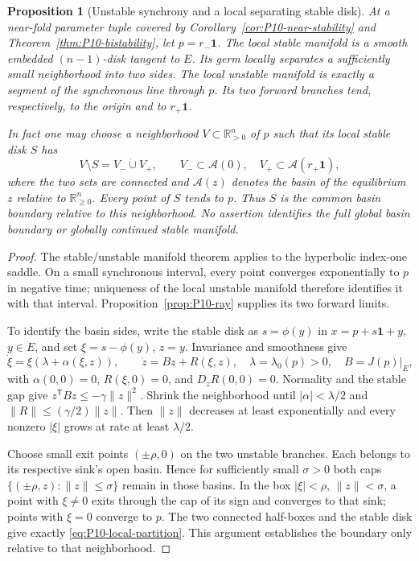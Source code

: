 \documentclass[11pt]{article}
\newcommand{\R}{\mathbb{R}}
\newcommand{\one}{\mathbf{1}}
\newcommand{\Orth}{\R_{\geq 0}^{n}}
\newcommand{\PosOrth}{\R_{>0}^{n}}
\newtheorem{proposition}[theorem]{Proposition}
\theoremstyle{definition}
\theoremstyle{remark}
\begin{document}
\begin{proposition}[Unstable synchrony and a local separating stable disk]
\label{prop:P10-local-basins}
At a near-fold parameter tuple covered by
Corollary~\ref{cor:P10-near-stability} and
Theorem~\ref{thm:P10-bistability}, let $p=r_-\one$.
The local stable manifold is a smooth embedded $(n-1)$-disk tangent
to $E$. Its germ locally separates a sufficiently small neighborhood
into two sides. The local unstable manifold is exactly a segment of
the synchronous line through $p$. Its two forward branches tend,
respectively, to the origin and to $r_+\one$.

In fact one may choose a neighborhood $V\subset\PosOrth$ of $p$
such that its local stable disk $S$ has
\begin{equation}
 V\setminus S=V_-\mathbin{\dot\cup}V_+,\qquad
 V_-\subset\mathcal A(0),\quad V_+\subset\mathcal A(r_+\one),
 \label{eq:P10-local-partition}
\end{equation}
where the two sets are connected and $\mathcal A(z)$ denotes the
basin of the equilibrium $z$ relative to $\Orth$. Every point of
$S$ tends to $p$. Thus $S$ is the common basin boundary \emph{relative
to this neighborhood}. No assertion identifies the full global basin
boundary or globally continued stable manifold.
\end{proposition}
\begin{proof}
The stable/unstable manifold theorem \cite[Ch.~1]{GuckenheimerHolmes1983}
applies to the hyperbolic index-one saddle. On a small synchronous
interval, every point converges exponentially to $p$ in negative time;
uniqueness of the local unstable manifold therefore identifies it with
that interval. Proposition~\ref{prop:P10-ray} supplies its two forward limits.

To identify the basin sides, write the stable disk as $s=\phi(y)$ in
$x=p+s\one+y$, $y\in E$, and set $\xi=s-\phi(y)$, $z=y$.
Invariance and smoothness give
\begin{equation}
 \dot\xi=\xi(\lambda+\alpha(\xi,z)),\qquad
 \dot z=Bz+R(\xi,z),\quad \lambda=\lambda_0(p)>0,\quad B=J(p)|_E,
 \label{eq:P10-saddle-chart}
\end{equation}
with $\alpha(0,0)=0$, $R(\xi,0)=0$, and $D_zR(0,0)=0$.
Normality and the stable gap give $z^{\mathsf T}Bz\le-\gamma\|z\|^2$.
Shrink the neighborhood until $|\alpha|<\lambda/2$ and
$\|R\|\le(\gamma/2)\|z\|$. Then $\|z\|$ decreases at least
exponentially and every nonzero $|\xi|$ grows at rate at least $\lambda/2$.

Choose small exit points $(\pm\rho,0)$ on the two unstable branches.
Each belongs to its respective sink's open basin. Hence for sufficiently
small $\sigma>0$ both caps $\{(\pm\rho,z):\|z\|\le\sigma\}$
remain in those basins. In the box $|\xi|<\rho$, $\|z\|<\sigma$,
a point with $\xi\ne0$ exits through the cap of its sign and converges
to that sink; points with $\xi=0$ converge to $p$. The two connected
half-boxes and the stable disk give exactly \eqref{eq:P10-local-partition}.
This argument establishes the boundary only relative to that neighborhood.
\end{proof}
\end{document}
